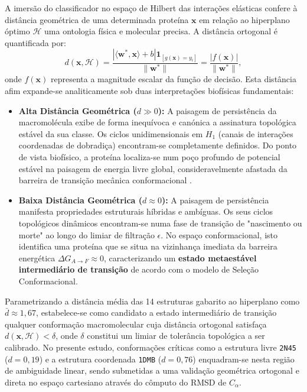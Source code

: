 \documentclass[12pt, a4paper]{article}
\begin{document}
A imersão do classificador no espaço de Hilbert das interações elásticas confere à distância geométrica de uma determinada proteína $\mathbf{x}$ em relação ao hiperplano óptimo $\mathcal{H}$ uma ontologia física e molecular precisa. A distância ortogonal é quantificada por:
\begin{equation}\label{eq:distancia_hiperplano}
d(\mathbf{x}, \mathcal{H}) = \frac{|\langle\mathbf{w}^*,\mathbf{x}\rangle + b| \mathbf{1}_{[g(\mathbf{x})=y_i]}}{\|\mathbf{w}^*\|} = \frac{|f(\mathbf{x})|}{\|\mathbf{w}^*\|},
\end{equation}
onde $f(\mathbf{x})$ representa a magnitude escalar da função de decisão. Esta distância afim expande-se analiticamente sob duas interpretações biofísicas fundamentais:

\begin{itemize}
    \item \textbf{Alta Distância Geométrica ($d \gg 0$):} A paisagem de persistência da macromolécula exibe de forma inequívoca e canónica a assinatura topológica estável da sua classe. Os ciclos unidimensionais em $H_1$ (canais de interações coordenadas de dobradiça) encontram-se completamente definidos. Do ponto de vista biofísico, a proteína localiza-se num poço profundo de potencial estável na paisagem de energia livre global, consideravelmente afastada da barreira de transição mecânica conformacional .
    \item \textbf{Baixa Distância Geométrica ($d \approx 0$):} A paisagem de persistência manifesta propriedades estruturais híbridas e ambíguas. Os seus ciclos topológicos dinâmicos encontram-se numa fase de transição de "nascimento ou morte" ao longo do limiar de filtração $\epsilon$. No espaço conformacional, isto identifica uma proteína que se situa na vizinhança imediata da barreira energética $\Delta G_{A \to F} \approx 0$, caracterizando um \textbf{estado metaestável intermediário de transição} de acordo com o modelo de Seleção Conformacional.
\end{itemize}

Parametrizando a distância média das 14 estruturas gabarito ao hiperplano como $\bar{d} \approx 1{,}67$, estabelece-se como candidato a estado intermediário de transição qualquer conformação macromolecular cuja distância ortogonal satisfaça $d(\mathbf{x},\mathcal{H}) < \delta$, onde $\delta$ constitui um limiar de tolerância topológica a ser calibrado. No presente estudo, conformações críticas como a estrutura livre \texttt{2N45} ($d = 0{,}19$) e a estrutura coordenada \texttt{1DMB} ($d = 0{,}76$) enquadram-se nesta região de ambiguidade linear, sendo submetidas a uma validação geométrica ortogonal e direta no espaço cartesiano através do cômputo do RMSD de $C_\alpha$.
\end{document}
